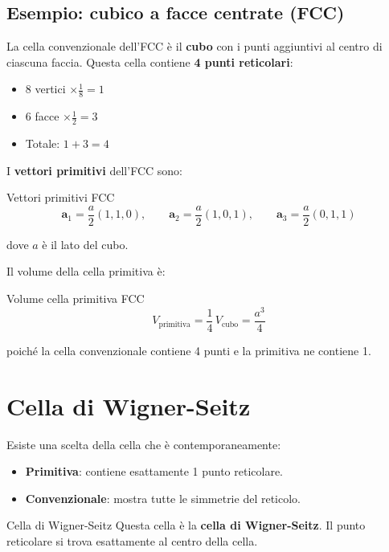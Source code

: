 \subsection*{Esempio: cubico a facce centrate (FCC)}
La cella convenzionale dell'FCC è il \textbf{cubo} con i punti aggiuntivi al centro di ciascuna faccia. Questa cella contiene \textbf{4 punti reticolari}:
\begin{itemize}
    \item 8 vertici $\times \frac{1}{8} = 1$
    \item 6 facce $\times \frac{1}{2} = 3$
    \item Totale: $1 + 3 = 4$
\end{itemize}

I \textbf{vettori primitivi} dell'FCC sono:
\begin{equazione}{Vettori primitivi FCC}
\begin{equation}
\mathbf{a}_1 = \frac{a}{2}(1, 1, 0), \qquad \mathbf{a}_2 = \frac{a}{2}(1, 0, 1), \qquad \mathbf{a}_3 = \frac{a}{2}(0, 1, 1)
\end{equation}
\end{equazione}
dove $a$ è il lato del cubo.

Il volume della cella primitiva è:
\begin{equazione}{Volume cella primitiva FCC}
\begin{equation}
V_{\text{primitiva}} = \frac{1}{4} \, V_{\text{cubo}} = \frac{a^3}{4}
\end{equation}
\end{equazione}
poiché la cella convenzionale contiene 4 punti e la primitiva ne contiene 1.

\section{Cella di Wigner-Seitz}

Esiste una scelta della cella che è contemporaneamente:
\begin{itemize}
    \item \textbf{Primitiva}: contiene esattamente 1 punto reticolare.
    \item \textbf{Convenzionale}: mostra tutte le simmetrie del reticolo.
\end{itemize}

\begin{definizione}{Cella di Wigner-Seitz}
Questa cella è la \textbf{cella di Wigner-Seitz}. Il punto reticolare si trova esattamente al centro della cella.
\end{definizione}



